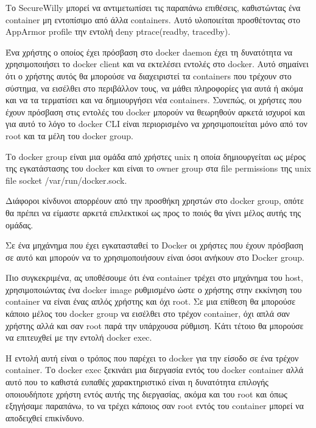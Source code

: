 \begin{description}[style=nextline]
Το \en SecureWilly\gr{} μπορεί να αντιμετωπίσει τις παραπάνω επιθέσεις, καθιστώντας ένα \en container\gr{} μη εντοπίσιμο από άλλα \en containers\gr{}. Αυτό υλοποιείται προσθέτοντας στο \en AppArmor profile\gr{} την εντολή \en deny ptrace(readby, tracedby)\gr{}.

\item[Πρόσβαση στο \en Docker Daemon\gr{}]
Ένα χρήστης ο οποίος έχει πρόσβαση στο \en docker daemon\gr{} έχει τη δυνατότητα να χρησιμοποιήσει το \en docker client\gr{} και να εκτελέσει εντολές στο \en docker\gr{}. Αυτό σημαίνει ότι ο χρήστης αυτός θα μπορούσε να διαχειριστεί τα \en containers\gr{} που τρέχουν στο σύστημα, να εισέλθει στο περιβάλλον τους, να μάθει πληροφορίες για αυτά ή ακόμα και να τα τερματίσει και να δημιουργήσει νέα \en containers\gr{}. Συνεπώς, οι χρήστες που έχουν πρόσβαση στις εντολές του \en docker\gr{} μπορούν να θεωρηθούν αρκετά ισχυροί και για αυτό το λόγο το \en docker CLI\gr{} είναι περιορισμένο να χρησιμοποιείται μόνο από τον \en root\gr{} και τα μέλη του \en docker group\gr{}.

Το \en docker group\gr{} είναι μια ομάδα από χρήστες \en unix\gr{} η οποία δημιουργείται ως μέρος της εγκατάστασης του \en docker\gr{} και είναι το \en owner group\gr{} στα \en file permissions\gr{} της \en unix file socket /var/run/docker.sock.\gr{}

Διάφοροι κίνδυνοι απορρέουν από την προσθήκη χρηστών στο \en docker group\gr{}, οπότε θα πρέπει να είμαστε αρκετά επιλεκτικοί ως προς το ποιός θα γίνει μέλος αυτής της ομάδας.

Σε ένα μηχάνημα που έχει εγκατασταθεί το \en Docker\gr{} οι χρήστες που έχουν πρόσβαση σε αυτό και μπορούν να το χρησιμοποιήσουν είναι όσοι ανήκουν στο \en Docker group\gr{}.

Πιο συγκεκριμένα, ας υποθέσουμε ότι ένα \en container\gr{} τρέχει στο μηχάνημα του \en host\gr{}, χρησιμοποιώντας ένα \en docker image\gr{} ρυθμισμένο ώστε ο χρήστης στην εκκίνηση του \en container\gr{} να είναι ένας απλός χρήστης και όχι \en root\gr{}. Σε μια επίθεση θα μπορούσε κάποιο μέλος του \en docker group\gr{} να εισέλθει στο τρέχον \en container\gr{}, όχι απλά σαν χρήστης αλλά και σαν \en root\gr{} παρά την υπάρχουσα ρύθμιση. Κάτι τέτοιο θα μπορούσε να επιτευχθεί με την εντολή \en docker exec\gr{}. 

Η εντολή αυτή είναι ο τρόπος που παρέχει το \en docker\gr{} για την είσοδο σε ένα τρέχον \en container\gr{}. Το \en docker exec\gr{} ξεκινάει μια διεργασία εντός του \en docker container\gr{} αλλά αυτό που το καθιστά ευπαθές χαρακτηριστικό είναι η δυνατότητα επιλογής οποιουδήποτε χρήστη εντός αυτής της διεργασίας, ακόμα και του \en root\gr{} και όπως εξηγήσαμε παραπάνω, το να τρέχει κάποιος σαν \en root\gr{} εντός του \en container\gr{} μπορεί να αποδειχθεί επικίνδυνο.


\end{description}
